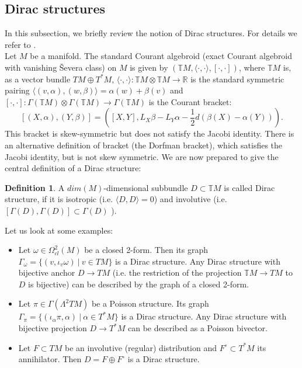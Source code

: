 \documentclass[a4paper,12pt]{amsart}
\theoremstyle{definition}
\newtheorem{Definition}{Definition}[section]
\begin{document}
\subsection{Dirac structures}
In this subsection, we briefly review the notion of Dirac structures. For details we refer to \cite{zbMATH00004959}. \\

Let $M$ be a manifold. The standard Courant
algebroid (exact Courant algebroid with vanishing \v{S}evera class) on $M$ is given by $(\mathbb TM, \langle\cdot,\cdot\rangle, [\cdot,\cdot])$, where $\mathbb TM$ is, as a vector bundle $TM\oplus T^*M$, $\langle\cdot,\cdot\rangle:\mathbb TM\otimes \mathbb TM\to \mathbb R$ is the standard symmetric pairing $\langle(v,\alpha),(w,\beta)\rangle=\alpha(w)+\beta(v)$ and $[\cdot,\cdot]:\Gamma(\mathbb TM)\otimes \Gamma(\mathbb TM)\to \Gamma(\mathbb TM)$ is the Courant bracket:
$$
[(X,\alpha),(Y,\beta)]=([X,Y],L_X\beta-L_Y\alpha -\frac{1}{2} d(\beta(X)-\alpha(Y))).
$$
This bracket is skew-symmetric but does not satisfy the Jacobi identity. There is an alternative definition of bracket (the Dorfman bracket), which satisfies the Jacobi identity, but is not skew symmetric. We are now prepared to give the central definition of a Dirac structure:

\begin{Definition}
A $dim(M)$-dimensional 
subbundle $D\subset \mathbb TM$ is called Dirac structure, if it is isotropic (i.e. $\langle D,D\rangle=0$) and involutive (i.e. $[\Gamma(D),\Gamma(D)]\subset \Gamma(D)$ ). 
\end{Definition}

Let us look at some examples:
\begin{itemize}
    \item Let $\omega\in\Omega_{cl}^2(M)$ be a closed 2-form. Then its graph $\Gamma_\omega=\{(v,\iota_v\omega) ~|~v\in TM\}$ is a Dirac structure. Any Dirac structure with bijective anchor 
    $D\to TM$ (i.e. the restriction of the projection $\mathbb TM\to TM$ to $D$ is bijective) can be described by the graph of a closed 2-form.
    \item Let $\pi\in\Gamma(\Lambda^2TM)$ be a Poisson structure. Its graph $\Gamma_\pi=\{(\iota_\alpha\pi,\alpha) ~|~\alpha\in T^*M\}$ is a Dirac structure. Any Dirac structure with bijective projection $D\to T^*M$ can be described as a Poisson bivector.
    \item Let $F\subset TM$ be an involutive (regular) distribution and $F^\circ\subset T^*M$ its annihilator. Then $D=F\oplus F^\circ$ is a Dirac structure.
\end{itemize}
\end{document}
